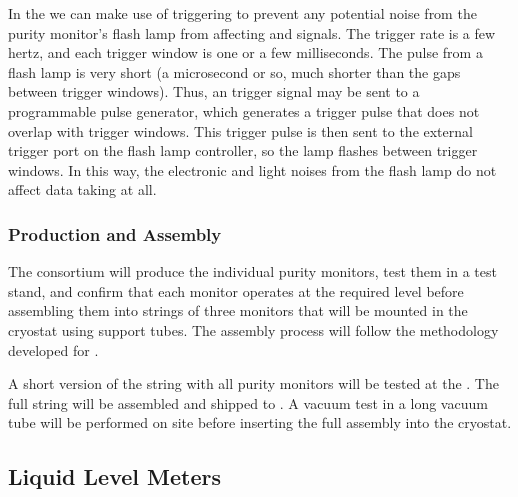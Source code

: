 In the  we can make use of triggering to prevent any potential noise from the purity monitor's flash lamp from affecting  and  signals. The  trigger rate is a few hertz, and each trigger window is one or a few milliseconds. %
The pulse from a flash lamp is very short (a microsecond or so, much shorter than the gaps between  trigger windows). 
Thus, an  trigger signal may be sent to a programmable pulse generator, %
which generates a trigger pulse that does not overlap with  trigger windows. This trigger pulse %
is then sent to the external trigger port on the flash lamp  controller, so the lamp flashes between  trigger windows. In this way, the electronic and light noises from the flash lamp do %
not affect %
data taking at all.


\subsubsection{Production and Assembly}
\label{sec:PrMon-Production-Assembly}

The  consortium will produce the individual purity monitors, test them in a test stand, and confirm that each monitor operates at the required level before assembling them into strings of three monitors that will be mounted in the  cryostat using support tubes. The assembly process will follow the methodology developed for .



A short version of the %
string
with all purity monitors will be tested at the . 
The full string will be assembled and shipped to  . 
 A vacuum test in a long vacuum tube will be performed on site before inserting the full assembly into the  cryostat. 


\subsection{Liquid Level Meters}


